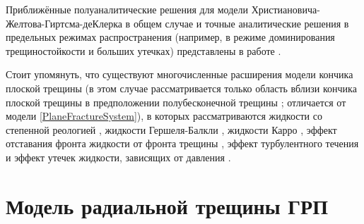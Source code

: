 Приближённые полуаналитические решения для модели Христиановича-
Желтова-Гиртсма-деКлерка в общем случае и точные аналитические решения в предельных режимах распространения (например, в режиме доминирования трещиностойкости и больших утечках) представлены в работе \cite{dontsov1}.

Стоит упомянуть, что существуют многочисленные расширения модели кончика плоской трещины (в этом случае рассматривается только область вблизи кончика плоской трещины в предположении полубесконечной трещины \cite{baykin_course}; отличается от модели \eqref{PlaneFractureSystem}), в которых рассматриваются жидкости со степенной реологией \cite{dontsov_kresse}, жидкости Гершеля-Балкли \cite{bessmertnykh}, жидкости Карро \cite{moukhtari}, эффект отставания фронта жидкости от фронта трещины \cite{garagash}, эффект турбулентного течения \cite{dontsov_turbulent} и эффект утечек жидкости, зависящих от давления \cite{kanin}.

\section{Модель радиальной трещины ГРП}
\vspace*{-5mm}


